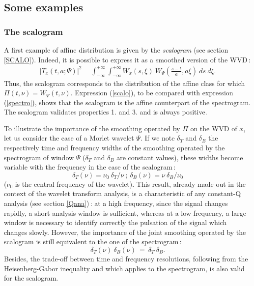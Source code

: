 \subsection{Some examples}
\subsubsection{The scalogram}
 A first example of affine distribution is given by the
  {\it scalogram} (see section \ref{SCALO}). Indeed, it is possible to
  express it as a smoothed version of the WVD\,:
\begin{eqnarray}
\label{scalo}
 |T_x(t,a;\Psi)|^2 = \int_{-\infty}^{+\infty}\int_{-\infty}^{+\infty}
W_x(s,\xi)\ W_{\Psi}\left(\frac{s-t}{a},a \xi\right)\ ds\ d\xi. 
\end{eqnarray}
Thus, the scalogram corresponds to the distribution of the affine class for
which $\Pi(t,\nu)=W_{\Psi}(t,\nu)$. Expression (\ref{scalo}), to be compared
with expression (\ref{spectro}), shows that the scalogram is the affine
counterpart of the spectrogram. The scalogram validates properties 1. and
3. and is always positive.

  To illustrate the importance of the smoothing operated by $\Pi$ on the
WVD of $x$, let us consider the case of a Morlet wavelet $\Psi$. If we note
$\delta_T$ and $\delta_B$ the respectively time and frequency widths of the
smoothing operated by the spectrogram of window $\Psi$ ($\delta_T$ and
$\delta_B$ are constant values), these widths become variable with the
frequency in the case of the scalogram\,:
\[\delta_T(\nu)=\nu_0\ \delta_T/\nu\ ;\ \delta_B(\nu)=\nu\ \delta_B/\nu_0\]
($\nu_0$ is the central frequency of the wavelet). This result, already made
out in the context of the wavelet transform analysis, is a characteristic
of any constant-Q analysis (see section \ref{Qana})\,: at a high frequency,
since the signal changes rapidly, a short analysis window is sufficient,
whereas at a low frequency, a large window is necessary to identify
correctly the pulsation of the signal which changes slowly. However, the
importance of the joint smoothing operated by the scalogram is still
equivalent to the one of the spectrogram\,:
\[\delta_T(\nu)\ \delta_B(\nu)\ =\ \delta_T\ \delta_B.\]
Besides, the trade-off between time and frequency resolutions, following from
the Heisenberg-Gabor inequality and which applies to the spectrogram, is
also valid for the scalogram.

